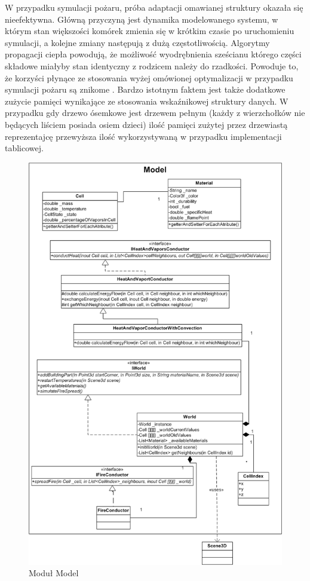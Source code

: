 W przypadku symulacji pożaru, próba adaptacji omawianej struktury okazała się nieefektywna.
Główną przyczyną jest dynamika modelowanego systemu, w którym stan większości komórek zmienia się w krótkim czasie po uruchomieniu symulacji, a kolejne zmiany następują z dużą częstotliwością. Algorytmy propagacji ciepła powodują, że możliwość wyodrębnienia  sześcianu  którego części składowe miałyby stan identyczny z rodzicem należy do rzadkości. Powoduje to, że korzyści płynące ze stosowania wyżej omówionej optymalizacji w przypadku symulacji pożaru są znikome . 
 Bardzo istotnym faktem jest także dodatkowe zużycie pamięci wynikające ze stosowania wskaźnikowej struktury danych. W przypadku gdy drzewo ósemkowe jest drzewem pełnym (każdy z wierzchołków nie będących liściem posiada osiem dzieci) ilość pamięci zużytej przez drzewiastą reprezentajcę przewyższa ilość wykorzystywaną w przypadku implementacji tablicowej.
\begin{figure}
\begin {center}
\includegraphics{uml_model.png} 
\caption {Moduł Model}
\label {uml_model}
\end {center}
\end{figure}
